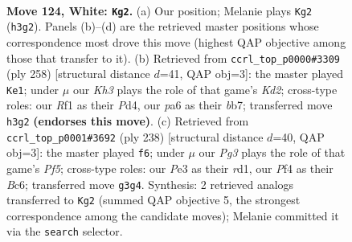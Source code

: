 \documentclass[11pt]{article}
\begin{document}
\clearpage

\begin{figure}[p]\centering
\begin{subfigure}{0.46\textwidth}\centering
\resizebox{\linewidth}{!}{%
\newchessgame
\chessboard[
  setfen={6k1/8/p5r1/P1p2p1p/1p3P1P/1P2P1PK/8/5R2 w - - 35 124},
  showmover=false,
  pgfstyle=straightmove, color=movearrow, markmove={h3-g2}
]}
\caption{}
\end{subfigure}\hfill
\begin{subfigure}{0.46\textwidth}\centering
\resizebox{\linewidth}{!}{%
\newchessgame
\chessboard[
  setfen={8/1b1k3N/8/1p3p2/p1pP1Pp1/P1P3P1/1P1K4/8 w - - 41 130},
  showmover=false,
  pgfstyle=straightmove, color=movearrow, markmove={d2-e1}
]}
\caption{}
\end{subfigure}
\\[4pt]
\begin{subfigure}{0.46\textwidth}\centering
\resizebox{\linewidth}{!}{%
\newchessgame
\chessboard[
  setfen={5k2/2n5/2Bp3p/p1p2Pp1/P1P3P1/1P2R2K/8/3r4 w - - 3 120},
  showmover=false,
  pgfstyle=straightmove, color=movearrow, markmove={f5-f6}
]}
\caption{}
\end{subfigure}\hfill

\caption{\textbf{Move 124, White: \texttt{Kg2}.} (a) Our position; Melanie plays \texttt{Kg2} (\texttt{h3g2}). Panels (b)--(d) are the retrieved master positions whose correspondence most drove this move (highest QAP objective among those that transfer to it). (b) Retrieved from \texttt{ccrl\_top\_p0000\#3309} (ply 258) [structural distance $d$=41, QAP obj=3]: the master played \texttt{Ke1}; under $\mu$ our \emph{Kh3} plays the role of that game's \emph{Kd2}; cross-type roles: our \emph{R}f1 as their \emph{P}d4, our \emph{p}a6 as their \emph{b}b7; transferred move \texttt{h3g2} \textbf{(endorses this move)}. (c) Retrieved from \texttt{ccrl\_top\_p0001\#3692} (ply 238) [structural distance $d$=40, QAP obj=3]: the master played \texttt{f6}; under $\mu$ our \emph{Pg3} plays the role of that game's \emph{Pf5}; cross-type roles: our \emph{P}e3 as their \emph{r}d1, our \emph{P}f4 as their \emph{B}c6; transferred move \texttt{g3g4}. Synthesis: 2 retrieved analogs transferred to \texttt{Kg2} (summed QAP objective 5, the strongest correspondence among the candidate moves); Melanie committed it via the \texttt{search} selector.}
\label{fig:thought-m246}
\end{figure}

\clearpage
\end{document}
